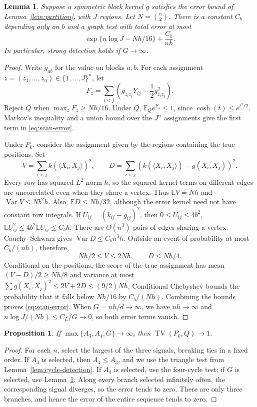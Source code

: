 \documentclass[11pt,reqno]{amsart}
\numberwithin{equation}{section}
\newtheorem{lemma}[theorem]{Lemma}
\newtheorem{proposition}[theorem]{Proposition}
\theoremstyle{definition}
\theoremstyle{remark}
\theoremstyle{definition}
\DeclareMathOperator{\Var}{Var}
\DeclareMathOperator{\TV}{TV}
\begin{document}
\begin{lemma}\label{lem:scan}
Suppose a symmetric block kernel $g$ satisfies the error bound of Lemma~\ref{lem:partition},
with $J$ regions. Let $N=\binom n2$.
There is a constant $C_b$ depending only on $b$ and a graph test with total error at most
\begin{equation}\label{eq:scan-error}
 \exp\{n\log J-Nh/16\}+\frac{C_b}{nh}.
\end{equation}
In particular, strong detection holds if $G\to\infty$.
\end{lemma}
\begin{proof}
Write $g_{ab}$ for the value on blocks $a,b$. For each assignment
$z=(z_1,\ldots,z_n)\in\{1,\ldots,J\}^n$, let
\[
 F_z=\sum_{i<j}\left(g_{z_i z_j}Y_{ij}-\frac12 g_{z_i z_j}^2\right).
\]
Reject $Q$ when $\max_zF_z\ge Nh/16$.
Under $Q$, $\mathbb E_Qe^{F_z}\le1$, since
$\cosh(t)\le e^{t^2/2}$. Markov's inequality and a union bound over the $J^n$ assignments
give the first term in \eqref{eq:scan-error}.

Under $P_k$, consider the assignment given by the regions containing the true positions. Set
\[
 V=\sum_{i<j}k(\langle X_i,X_j\rangle)^2,\qquad
 D=\sum_{i<j}(k(\langle X_i,X_j\rangle)-g(X_i,X_j))^2.
\]
Every row has squared $L^2$ norm $h$, so the squared kernel terms on different edges are uncorrelated even when they share a vertex.
Thus $\mathbb EV=Nh$ and $\Var V\le Nb^2h$.
Also, $\mathbb ED\le Nh/32$, although the error kernel need not have constant row integrals.
If $U_{ij}=(k_{ij}-g_{ij})^2$, then
$0\le U_{ij}\le4b^2$, $\mathbb EU_{ij}^2\le4b^2\mathbb EU_{ij}\le C_bh$.
There are $O(n^3)$ pairs of edges sharing a vertex. Cauchy--Schwarz gives
$\Var D\le C_bn^3h$. Outside an event of probability at most $C_b/(nh)$, therefore,
\[
 Nh/2\le V\le2Nh,\qquad D\le Nh/4.
\]
Conditional on the positions, the score of the true assignment has mean $(V-D)/2\ge Nh/8$
and variance at most
$\sum g(X_i,X_j)^2\le2V+2D\le(9/2)Nh$.
Conditional Chebyshev bounds the probability that it falls below $Nh/16$ by $C_b/(Nh)$.
Combining the bounds proves \eqref{eq:scan-error}.
When $G=nh/d\to\infty$, we have $nh\to\infty$ and
$n\log J/(Nh)\le C_L/G\to0$, so both error terms vanish.
\end{proof}

\begin{proposition}\label{prop:detect}
If $\max\{A_3,A_4,G\}\to\infty$, then $\TV(P_k,Q)\to1$.
\end{proposition}
\begin{proof}
For each $n$, select the largest of the three signals, breaking ties in a fixed order.
If $A_3$ is selected, then $A_4\le A_3$, and we use the triangle test from Lemma~\ref{lem:cycle-detection}.
If $A_4$ is selected, use the four-cycle test; if $G$ is selected, use Lemma~\ref{lem:scan}.
Along every branch selected infinitely often, the corresponding signal diverges, so the error tends to zero.
There are only three branches, and hence the error of the entire sequence tends to zero.
\end{proof}
\end{document}
